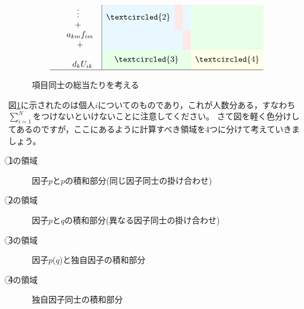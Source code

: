\documentclass{ltjsbook}
\begin{document}
\begin{figure}[ht]
\[\begin{array}{rl|cccccc|}
                    & \hspace{10pt}\begin{array}{c}\vdots\\+\end{array}     & \multicolumn{3}{>{\columncolor{cyan!9}}c}{\textcircled{\scriptsize 2}}  & \multicolumn{1}{>{\columncolor{red!9}}c}{}                               & \multicolumn{1}{>{\columncolor{cyan!9}}c}{}                            & \multicolumn{1}{>{\columncolor{green!9}}c}{}                                                         \\
                    & \begin{array}{c}a_{km}f_{im}\\+\end{array}            & \multicolumn{4}{>{\columncolor{cyan!9}}c}{}                             & \multicolumn{1}{>{\columncolor{red!9}}c}{}                               & \multicolumn{1}{>{\columncolor{green!9}}c}{}                                                                                                                                  \\
                    & \hspace{7pt}\begin{array}{c}\\d_kU_{ik}\\ \end{array} & \multicolumn{5}{>{\columncolor{green!9}}c}{\textcircled{\scriptsize 3}} & \multicolumn{1}{>{\columncolor{yellow!9}}c}{\textcircled{\scriptsize 4}}                                                                                                                                                                                 \\\hline
        \end{array}
    \]
    \caption{項目同士の総当たりを考える}
    \label{x03_multiply}
\end{figure}

図\ref{x03_multiply}に示されたのは個人$i$についてのものであり，これが人数分ある，すなわち$\sum_{i=1}^N$をつけないといけないことに注意してください。
さて図を軽く色分けしてあるのですが，ここにあるように計算すべき領域を4つに分けて考えていきましょう。
\begin{description}
    \item[\textcircled{\scriptsize 1}の領域] 因子$p$と$p$の積和部分(同じ因子同士の掛け合わせ)
    \item[\textcircled{\scriptsize 2}の領域] 因子$p$と$q$の積和部分(異なる因子同士の掛け合わせ)
    \item[\textcircled{\scriptsize 3}の領域] 因子$p$($q$)と独自因子の積和部分
    \item[\textcircled{\scriptsize 4}の領域] 独自因子同士の積和部分
\end{description}
\end{document}
